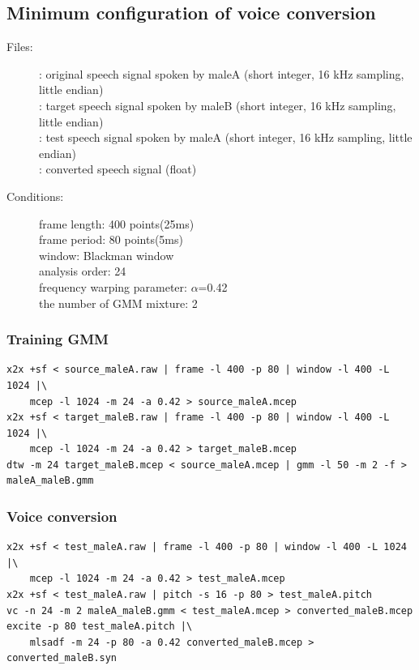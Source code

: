 \documentclass[a4paper,10pt]{article}
\begin{document}
\subsection{Minimum configuration of voice conversion}
\begin{description}
 \item[Files:]
   : 
	    original speech signal spoken by maleA (short integer, 16 kHz sampling, little endian) \\
   : 
	    target speech signal spoken by maleB (short integer, 16 kHz sampling, little endian) \\
   : 
	    test speech signal spoken by maleA (short integer, 16 kHz sampling, little endian) \\
   : 
	    converted speech signal (float)
 \item[Conditions:] 
   frame length: 400 points(25ms) \\
   frame period: 80 points(5ms) \\
   window: Blackman window \\
   analysis order: 24 \\
   frequency warping parameter: $\alpha$=0.42 \\
   the number of GMM mixture: 2
\end{description}
\subsubsection{Training GMM}
\begin{verbatim}
x2x +sf < source_maleA.raw | frame -l 400 -p 80 | window -l 400 -L 1024 |\
    mcep -l 1024 -m 24 -a 0.42 > source_maleA.mcep
x2x +sf < target_maleB.raw | frame -l 400 -p 80 | window -l 400 -L 1024 |\
    mcep -l 1024 -m 24 -a 0.42 > target_maleB.mcep
dtw -m 24 target_maleB.mcep < source_maleA.mcep | gmm -l 50 -m 2 -f > maleA_maleB.gmm
\end{verbatim}
\subsubsection{Voice conversion}
\begin{verbatim}
x2x +sf < test_maleA.raw | frame -l 400 -p 80 | window -l 400 -L 1024 |\
    mcep -l 1024 -m 24 -a 0.42 > test_maleA.mcep
x2x +sf < test_maleA.raw | pitch -s 16 -p 80 > test_maleA.pitch
vc -n 24 -m 2 maleA_maleB.gmm < test_maleA.mcep > converted_maleB.mcep
excite -p 80 test_maleA.pitch |\
    mlsadf -m 24 -p 80 -a 0.42 converted_maleB.mcep > converted_maleB.syn
\end{verbatim}
\end{document}
